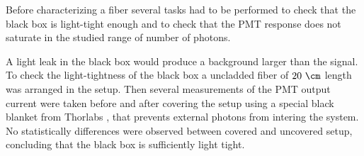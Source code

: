 
Before characterizing a fiber several tasks had to be performed to check that the black box is light-tight enough and to check that the PMT response does not saturate in the studied range of number of photons.


A light leak in the black box would produce a background larger than the signal. To check the light-tightness of the black box a uncladded fiber of $20~\cm$ length was arranged in the setup. Then several measurements of the PMT output current were taken before and after covering the setup using a special black blanket from Thorlabs \cite{BlackBlancket}, that prevents external photons from intering the system. No statistically differences were observed between covered and uncovered setup, concluding that the black box is sufficiently light tight. 





